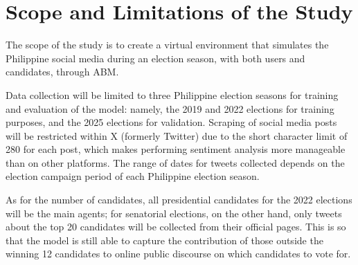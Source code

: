 \section{Scope and Limitations of the Study}
The scope of the study is to create a virtual environment that simulates the Philippine social media during an election season, with both users and candidates, through ABM.

Data collection will be limited to three Philippine election seasons for training and evaluation of the model: namely, the 2019 and 2022 elections for training purposes, and the 2025 elections for validation. Scraping of social media posts will be restricted within X (formerly Twitter) due to the short character limit of 280 for each post, which makes performing sentiment analysis more manageable than on other platforms. The range of dates for tweets collected depends on the election campaign period of each Philippine election season.

As for the number of candidates, all presidential candidates for the 2022 elections will be the main agents; for senatorial elections, on the other hand, only tweets about the top 20 candidates will be collected from their official pages. This is so that the model is still able to capture the contribution of those outside the winning 12 candidates to online public discourse on which candidates to vote for.
